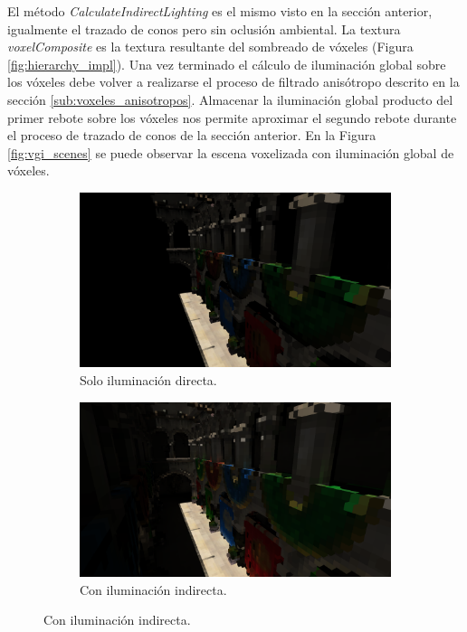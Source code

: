 El método \emph{CalculateIndirectLighting} es el mismo visto en la sección anterior, igualmente el trazado de conos pero sin oclusión ambiental. La textura \emph{voxelComposite} es la textura resultante del sombreado de vóxeles (Figura \ref{fig:hierarchy_impl}). Una vez terminado el cálculo de iluminación global sobre los vóxeles debe volver a realizarse el proceso de filtrado anisótropo descrito en la sección \ref{sub:voxeles_anisotropos}. Almacenar la iluminación global producto del primer rebote sobre los vóxeles nos permite aproximar el segundo rebote durante el proceso de trazado de conos de la sección anterior. En la Figura \ref{fig:vgi_scenes} se puede observar la escena voxelizada con iluminación global de vóxeles.
\begin{figure}[H]
	\centering
	\begin{subfigure}[t]{0.35\textwidth}
		\centering
		\captionsetup{justification=centering}
		\caption*{Solo iluminación directa.}
		\includegraphics[width=\linewidth]{media/voxel_direct.png}
	\end{subfigure}%
	\hspace{0.05\textwidth}
	\begin{subfigure}[t]{0.35\textwidth}
		\centering
		\captionsetup{justification=centering}
		\caption*{Con iluminación indirecta.}
		\includegraphics[width=\linewidth]{media/voxel_gi.png}

\end{subfigure}
\end{figure}
